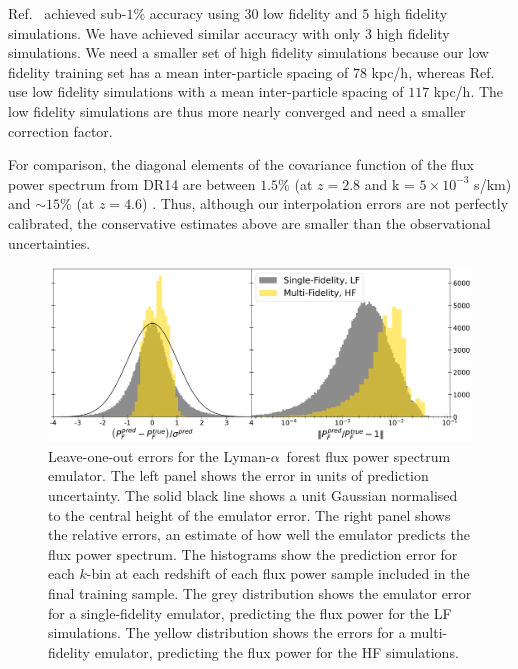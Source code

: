 \documentclass[a4paper,11pt]{article}
\newcommand{\Lya}{Lyman-$\alpha$}
\begin{document}
Ref.~\cite{Fernandez:2022} achieved sub-$1\%$ accuracy using $30$ low fidelity and $5$ high fidelity simulations. We have achieved similar accuracy with only $3$ high fidelity simulations. We need a smaller set of high fidelity simulations because our low fidelity training set has a mean inter-particle spacing of $78$ kpc/h, whereas Ref.~\cite{Fernandez:2022} use low fidelity simulations with a mean inter-particle spacing of $117$ kpc/h. The low fidelity simulations are thus more nearly converged and need a smaller correction factor.

For comparison, the diagonal elements of the covariance function of the flux power spectrum from DR14 are between $1.5\%$ (at $z=2.8$ and k = $5\times 10^{-3}$ s/km) and $\sim 15\%$ (at $z=4.6$) \cite{Chabanier:2019}. Thus, although our interpolation errors are not perfectly calibrated, the conservative estimates above are smaller than the observational uncertainties.

\begin{figure}
    \centering
    \includegraphics[width=\textwidth]{figures/fpsemu_errors.pdf}
    \caption{\label{fig:fps_error}
    Leave-one-out errors for the \Lya~forest flux power spectrum emulator.
    The left panel shows the error in units of prediction uncertainty. The solid black line shows a unit Gaussian normalised to the central height of the emulator error.
    The right panel shows the relative errors, an estimate of how well the emulator predicts the flux power spectrum.
    The histograms show the prediction error for each $k$-bin at each redshift of each flux power sample included in the final training sample.
    The grey distribution shows the emulator error for a single-fidelity emulator, predicting the flux power for the LF simulations.
    The yellow distribution shows the errors for a multi-fidelity emulator, predicting the flux power for the HF simulations.
    }
\end{figure}
\end{document}
